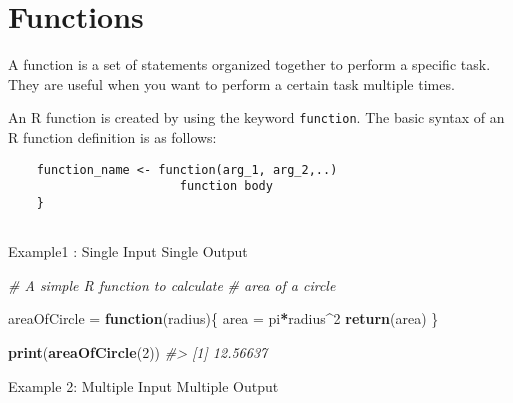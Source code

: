 \documentclass[
]{book}
\newenvironment{Shaded}{\begin{snugshade}}{\end{snugshade}}
\newcommand{\CommentTok}[1]{\textcolor[rgb]{0.56,0.35,0.01}{\textit{#1}}}
\newcommand{\ControlFlowTok}[1]{\textcolor[rgb]{0.13,0.29,0.53}{\textbf{#1}}}
\newcommand{\DecValTok}[1]{\textcolor[rgb]{0.00,0.00,0.81}{#1}}
\newcommand{\FunctionTok}[1]{\textcolor[rgb]{0.13,0.29,0.53}{\textbf{#1}}}
\newcommand{\NormalTok}[1]{#1}
\newcommand{\OtherTok}[1]{\textcolor[rgb]{0.56,0.35,0.01}{#1}}
\newcommand{\SpecialCharTok}[1]{\textcolor[rgb]{0.81,0.36,0.00}{\textbf{#1}}}
\begin{document}
\hypertarget{functions}{%
\section{Functions}\label{functions}}

A function is a set of statements organized together to perform a specific task. They are useful when you want to perform a certain task multiple times.

An R function is created by using the keyword \texttt{function}. The basic syntax of an R function definition is as follows:

\begin{verbatim}
    function_name <- function(arg_1, arg_2,..) 
                        function body
    }
    
\end{verbatim}

Example1 : Single Input Single Output

\begin{Shaded}
\begin{Highlighting}[]
\CommentTok{\# A simple R function to calculate }
\CommentTok{\# area of a circle}
 
\NormalTok{areaOfCircle }\OtherTok{=} \ControlFlowTok{function}\NormalTok{(radius)\{}
\NormalTok{  area }\OtherTok{=}\NormalTok{ pi}\SpecialCharTok{*}\NormalTok{radius}\SpecialCharTok{\^{}}\DecValTok{2}
  \FunctionTok{return}\NormalTok{(area)}
\NormalTok{\}}
 
\FunctionTok{print}\NormalTok{(}\FunctionTok{areaOfCircle}\NormalTok{(}\DecValTok{2}\NormalTok{))}
\CommentTok{\#\textgreater{} [1] 12.56637}
\end{Highlighting}
\end{Shaded}

Example 2: Multiple Input Multiple Output
\end{document}
